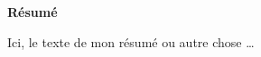 \begin{center}\bfseries\Huge
    Résumé
\end{center}
Ici, le texte de mon résumé ou autre chose \ldots